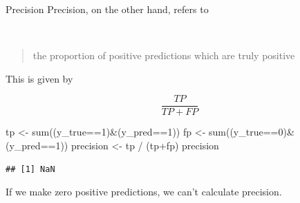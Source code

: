 \documentclass[
  10pt,
  ignorenonframetext,
  aspectratio=169]{beamer}
\newenvironment{Shaded}{\begin{snugshade}}{\end{snugshade}}
\newcommand{\DecValTok}[1]{\textcolor[rgb]{0.86,0.86,0.80}{#1}}
\newcommand{\FunctionTok}[1]{\textcolor[rgb]{0.94,0.94,0.56}{#1}}
\newcommand{\NormalTok}[1]{\textcolor[rgb]{0.80,0.80,0.80}{#1}}
\newcommand{\OtherTok}[1]{\textcolor[rgb]{0.94,0.94,0.56}{#1}}
\newcommand{\SpecialCharTok}[1]{\textcolor[rgb]{0.86,0.64,0.64}{#1}}
\begin{document}
\begin{frame}[fragile]{Precision}
\protect\hypertarget{precision}{}
Precision, on the other hand, refers to

~

\begin{quote}
the proportion of positive predictions which are truly positive
\end{quote}

This is given by

\[ \frac{TP}{TP+FP}\]

\scriptsize

\begin{Shaded}
\begin{Highlighting}[]
\NormalTok{tp }\OtherTok{\textless{}{-}} \FunctionTok{sum}\NormalTok{((y\_true}\SpecialCharTok{==}\DecValTok{1}\NormalTok{)}\SpecialCharTok{\&}\NormalTok{(y\_pred}\SpecialCharTok{==}\DecValTok{1}\NormalTok{))}
\NormalTok{fp }\OtherTok{\textless{}{-}} \FunctionTok{sum}\NormalTok{((y\_true}\SpecialCharTok{==}\DecValTok{0}\NormalTok{)}\SpecialCharTok{\&}\NormalTok{(y\_pred}\SpecialCharTok{==}\DecValTok{1}\NormalTok{))}
\NormalTok{precision }\OtherTok{\textless{}{-}}\NormalTok{ tp }\SpecialCharTok{/}\NormalTok{ (tp}\SpecialCharTok{+}\NormalTok{fp)}
\NormalTok{precision}
\end{Highlighting}
\end{Shaded}

\begin{verbatim}
## [1] NaN
\end{verbatim}

If we make zero positive predictions, we can't calculate precision.
\end{frame}
\end{document}
